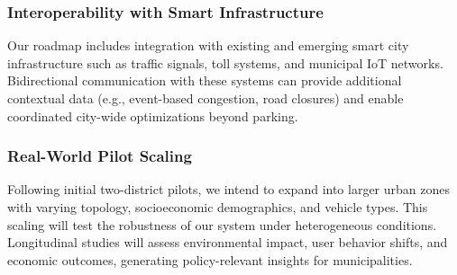 \subsubsection*{Interoperability with Smart Infrastructure}

Our roadmap includes integration with existing and emerging smart city infrastructure such as traffic signals, toll systems, and municipal IoT networks. Bidirectional communication with these systems can provide additional contextual data (e.g., event-based congestion, road closures) and enable coordinated city-wide optimizations beyond parking.

\subsubsection*{Real-World Pilot Scaling}

Following initial two-district pilots, we intend to expand into larger urban zones with varying topology, socioeconomic demographics, and vehicle types. This scaling will test the robustness of our system under heterogeneous conditions. Longitudinal studies will assess environmental impact, user behavior shifts, and economic outcomes, generating policy-relevant insights for municipalities.